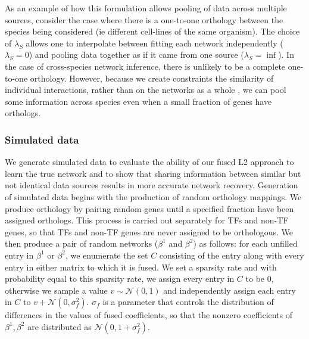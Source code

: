 \documentclass[11pt]{article}
\begin{document}
As an example of how this formulation allows pooling of data across multiple sources, consider the case where there is a one-to-one orthology between the species being considered (ie different cell-lines of the same organism). The choice of $\lambda_S$ allows one to interpolate between fitting each network independently ($\lambda_S=0$) and pooling data together as if it came from one source ($\lambda_S=\inf$). In the case of cross-species network inference, there is unlikely to be a complete one-to-one orthology. However, because we create constraints the similarity of individual interactions, rather than on the networks as a whole \cite{parikh2011treegl}, we can pool some information across species even when a small fraction of genes have orthologs. 


\subsubsection{Simulated data}
We generate simulated data to evaluate the ability of our fused L2 approach to learn the true network and to show that sharing information between similar but not identical data sources results in more accurate network recovery. 
Generation of simulated data begins with the production of random orthology mappings. 
We produce orthology by pairing random genes until a specified fraction have been assigned orthologs. 
This process is carried out separately for TFs and non-TF genes, so that TFs and non-TF genes are never assigned to be orthologous. 
We then produce a pair of random networks ($\beta^1$ and $\beta^2$) as follows: for each unfilled entry in $\beta^1$ or $\beta^2$, we enumerate the set $C$ consisting of the entry along with every entry in either matrix to which it is fused. We set a sparsity rate and with probability equal to this sparsity rate, we assign every entry in $C$ to be 0, otherwise we sample a value $v \sim \mathcal{N}(0,1)$ and independently assign each entry in $C$ to $v + \mathcal{N}(0, \sigma_f^2)$. $\sigma_f$ is a parameter that controls the distribution of differences in the values of fused coefficients, so that the nonzero coefficients of $\beta^1, \beta^2$ are distributed as $\mathcal{N}(0, 1 + \sigma_f^2)$.
\end{document}
